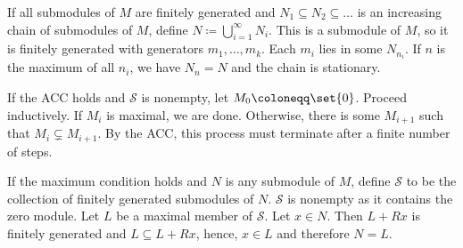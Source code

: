 If all submodules of $M$ are finitely generated and $N_1 \subseteq N_2 \subseteq \ldots$ is
an increasing chain of submodules of $M$, define $N\coloneqq \bigcup_{i = 1}^\infty N_i$.
This is a submodule of $M$, so it is finitely generated with generators
$m_1, \ldots, m_k$. Each $m_i$ lies in some $N_{n_i}$. If $n$ is the maximum of all
$n_i$, we have $N_n = N$ and the chain is stationary.

If the ACC holds and $\mathcal{S}$ is nonempty, let $M_0 \coloneqq \set{0}$.
Proceed inductively. If $M_i$ is maximal, we are done. Otherwise, there is some
$M_{i+1}$ such that $M_i\subsetneq M_{i+1}$. By the ACC, this process must terminate
after a finite number of steps.

If the maximum condition holds and $N$ is any submodule of $M$, define $\mathcal{S}$
to be the collection of finitely generated submodules of $N$. $\mathcal{S}$ is nonempty
as it contains the zero module. Let $L$ be a maximal member of $\mathcal{S}$. Let
$x \in N$. Then $L + Rx$ is finitely generated and $L \subseteq L + Rx$, hence, $x \in L$
and therefore $N = L$.
